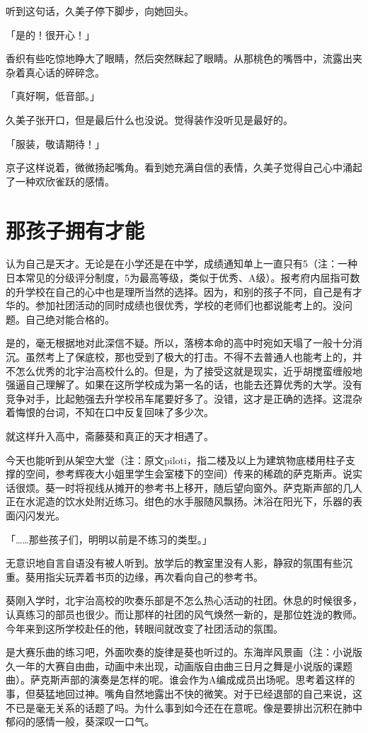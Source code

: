 \documentclass[UTF8]{ctexart}
\begin{document}
    听到这句话，久美子停下脚步，向她回头。

    「是的！很开心！」

    香织有些吃惊地睁大了眼睛，然后突然眯起了眼睛。从那桃色的嘴唇中，流露出夹杂着真心话的碎碎念。

    「真好啊，低音部。」

    久美子张开口，但是最后什么也没说。觉得装作没听见是最好的。

    「服装，敬请期待！」

    京子这样说着，微微扬起嘴角。看到她充满自信的表情，久美子觉得自己心中涌起了一种欢欣雀跃的感情。
    \section{那孩子拥有才能}
    认为自己是天才。无论是在小学还是在中学，成绩通知单上一直只有5（注：一种日本常见的分级评分制度，5为最高等级，类似于优秀、A级）。报考府内屈指可数的升学校在自己的心中也是理所当然的选择。因为，和别的孩子不同，自己是有才华的。参加社团活动的同时成绩也很优秀，学校的老师们也都说能考上的。没问题。自己绝对能合格的。

    是的，毫无根据地对此深信不疑。所以，落榜本命的高中时宛如天塌了一般十分消沉。虽然考上了保底校，那也受到了极大的打击。不得不去普通人也能考上的，并不怎么优秀的北宇治高校什么的。但是，为了接受这就是现实，近乎胡搅蛮缠般地强逼自己理解了。如果在这所学校成为第一名的话，也能去还算优秀的大学。没有竞争对手，比起勉强去升学校吊车尾要好多了。没错，这才是正确的选择。这混杂着悔恨的台词，不知在口中反复回味了多少次。

    就这样升入高中，斋藤葵和真正的天才相遇了。

    今天也能听到从架空大堂（注：原文piloti，指二楼及以上为建筑物底楼用柱子支撑的空间，参考辉夜大小姐里学生会室楼下的空间）传来的稀疏的萨克斯声。说实话很烦。葵一时将视线从摊开的参考书上移开，随后望向窗外。萨克斯声部的几人正在水泥造的饮水处附近练习。绀色的水手服随风飘扬。沐浴在阳光下，乐器的表面闪闪发光。

    「……那些孩子们，明明以前是不练习的类型。」

    无意识地自言自语没有被人听到。放学后的教室里没有人影，静寂的氛围有些沉重。葵用指尖玩弄着书页的边缘，再次看向自己的参考书。

    葵刚入学时，北宇治高校的吹奏乐部是不怎么热心活动的社团。休息的时候很多，认真练习的部员也很少。而让那样的社团的风气焕然一新的，是那位姓泷的教师。今年来到这所学校赴任的他，转眼间就改变了社团活动的氛围。

    是大赛乐曲的练习吧，外面吹奏的旋律是葵也听过的。东海岸风景画（注：小说版久一年的大赛自由曲，动画中未出现，动画版自由曲三日月之舞是小说版的课题曲）。萨克斯声部的演奏是怎样的呢。谁会作为A编成成员出场呢。思考着这样的事，但葵猛地回过神。嘴角自然地露出不快的微笑。对于已经退部的自己来说，这不已是毫无关系的话题了吗。为什么事到如今还在在意呢。像是要排出沉积在肺中郁闷的感情一般，葵深叹一口气。
\end{document}
